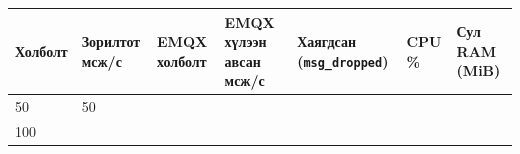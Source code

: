 \begingroup\scriptsize\begin{longtable}[]{@{}lllllll@{}}
\toprule
\begin{minipage}[b]{0.12\columnwidth}\raggedright
Холболт\strut
\end{minipage} & \begin{minipage}[b]{0.12\columnwidth}\raggedright
Зорилтот мсж/с\strut
\end{minipage} & \begin{minipage}[b]{0.12\columnwidth}\raggedright
EMQX холболт\strut
\end{minipage} & \begin{minipage}[b]{0.12\columnwidth}\raggedright
EMQX хүлээн авсан мсж/с\strut
\end{minipage} & \begin{minipage}[b]{0.12\columnwidth}\raggedright
Хаягдсан (\texttt{msg\_dropped})\strut
\end{minipage} & \begin{minipage}[b]{0.12\columnwidth}\raggedright
CPU \%\strut
\end{minipage} & \begin{minipage}[b]{0.12\columnwidth}\raggedright
Сул RAM (MiB)\strut
\end{minipage}\tabularnewline
\midrule
\endhead
\begin{minipage}[t]{0.12\columnwidth}\raggedright
50\strut
\end{minipage} & \begin{minipage}[t]{0.12\columnwidth}\raggedright
50\strut
\end{minipage} & \begin{minipage}[t]{0.12\columnwidth}\raggedright
\strut
\end{minipage} & \begin{minipage}[t]{0.12\columnwidth}\raggedright
\strut
\end{minipage} & \begin{minipage}[t]{0.12\columnwidth}\raggedright
\strut
\end{minipage} & \begin{minipage}[t]{0.12\columnwidth}\raggedright
\strut
\end{minipage} & \begin{minipage}[t]{0.12\columnwidth}\raggedright
\strut
\end{minipage}\tabularnewline
\begin{minipage}[t]{0.12\columnwidth}\raggedright
100\strut
\end{minipage} & \begin{minipage}[t]{0.12\columnwidth}\raggedright

\end{minipage}
\end{longtable}

